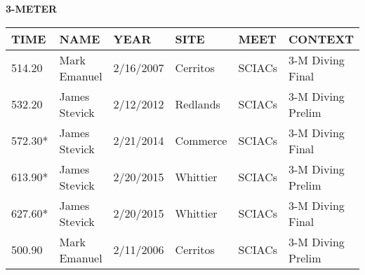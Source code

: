 \vspace{0.4cm}

\begin{center}
\begin{minipage}[t]{0.7\textwidth}
\centering
\textbf{3-METER}\\[0.05cm]
\begin{tabular}{@{}p{1.8cm}p{2.8cm}p{1.2cm}p{1.4cm}p{1.4cm}p{2.0cm}@{}}
\hline
\textbf{TIME} & \textbf{NAME} & \textbf{YEAR} & \textbf{SITE} & \textbf{MEET} & \textbf{CONTEXT} \\
\hline
514.20 & Mark Emanuel & 2/16/2007 & Cerritos & SCIACs & 3-M Diving Final \\
532.20 & James Stevick & 2/12/2012 & Redlands & SCIACs & 3-M Diving Prelim \\
572.30* & James Stevick & 2/21/2014 & Commerce & SCIACs & 3-M Diving Final \\
613.90* & James Stevick & 2/20/2015 & Whittier & SCIACs & 3-M Diving Prelim \\
627.60* & James Stevick & 2/20/2015 & Whittier & SCIACs & 3-M Diving Final \\
500.90 & Mark Emanuel & 2/11/2006 & Cerritos & SCIACs & 3-M Diving Prelim \\
\hline
\end{tabular}
\end{minipage}
\end{center}

\vspace{0.4cm}


